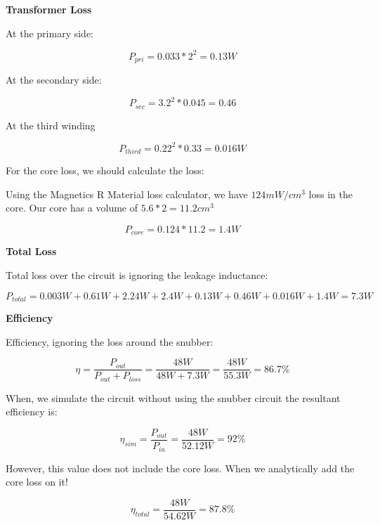 \textbf{Transformer Loss}

At the primary side:

\begin{equation}
    P_{pri} = 0.033 * 2^2 = 0.13W
\end{equation}

At the secondary side:

\begin{equation}
    P_{sec} = 3.2^2*0.045 = 0.46
\end{equation}

At the third winding

\begin{equation}
    P_{third} = 0.22^2 * 0.33 = 0.016W
\end{equation}

For the core loss, we should calculate the loss: 

Using the Magnetics R Material loss calculator, we have $124mW/cm^3$ loss in the core. Our core has a volume of $5.6*2 = 11.2 cm^3$

\begin{equation}
    P_{core} = 0.124 * 11.2 = 1.4W
\end{equation}

\textbf{Total Loss}

Total loss over the circuit is ignoring the leakage inductance:

\begin{equation}
    P_{total} = 0.003W + 0.61W + 2.24W + 2.4W + 0.13W + 0.46W + 0.016W + 1.4W = 7.3W
\end{equation}

\textbf{Efficiency}

Efficiency, ignoring the loss around the snubber:

\begin{equation}
    \eta = \dfrac{P_{out}}{P_{out} + P_{loss}} = \dfrac{48W}{48W+7.3W} = \dfrac{48W}{55.3W} = 86.7\%
\end{equation}

When, we simulate the circuit without using the snubber circuit the resultant efficiency is:

\begin{equation}
    \eta_{sim} = \dfrac{P_{out}}{P_{in}} = \dfrac{48W}{52.12W} = 92\% 
\end{equation}

However, this value does not include the core loss. When we analytically add the core loss on it!

\begin{equation}
    \eta_{total} = \dfrac{48W}{54.62W} = 87.8\% 
\end{equation}

